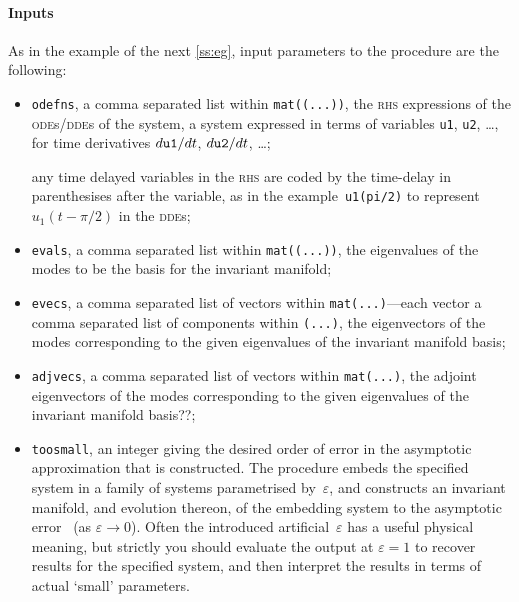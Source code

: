 \documentclass[11pt,a5paper]{article}
\def\eps{\varepsilon}
\begin{document}
\paragraph{Inputs}
As in the example of the next \cref{ss:eg}, input parameters
to the procedure are the following: \begin{itemize}

\item \verb|odefns|, a comma separated list within
\verb|mat((...))|, the \textsc{rhs} expressions of the
\textsc{ode}s/\textsc{dde}s of the system, a system
expressed in terms of variables \verb|u1|, \verb|u2|,
\ldots, for time derivatives \(\de t{\tt u1}\), \(\de t{\tt
u2}\), \ldots;

any time delayed variables in the \textsc{rhs} are coded by
the time-delay in parenthesises after the variable, as in
the example~\verb|u1(pi/2)| to represent~\(u_1(t-\pi/2)\) in
the \textsc{dde}s;

\item \verb|evals|, a comma separated list within
\verb|mat((...))|, the eigenvalues of the modes to be the
basis for the invariant manifold;

\item \verb|evecs|, a comma separated list of vectors within
\verb|mat(...)|---each vector a comma separated list of
components within \verb|(...)|, the eigenvectors of the
modes corresponding to the given eigenvalues of the
invariant manifold basis;

\item \verb|adjvecs|, a comma separated list of vectors
within \verb|mat(...)|, the adjoint eigenvectors of the
modes corresponding to the given eigenvalues of the
invariant manifold basis??;

\item \verb|toosmall|, an integer giving the desired order
of error in the asymptotic approximation that is
constructed.  The procedure embeds the specified system in a
family of systems parametrised by~\(\eps\), and constructs
an invariant manifold, and evolution thereon, of the
embedding system to the asymptotic error~\Ord{\eps^{\tt
toosmall}} (as \(\eps\to0\)). Often the introduced
artificial~\(\eps\) has a useful physical meaning, but
strictly you should  evaluate the output at \(\eps=1\) to
recover results for the specified system, and then interpret
the results in terms of actual `small' parameters.

\end{itemize}
\end{document}
